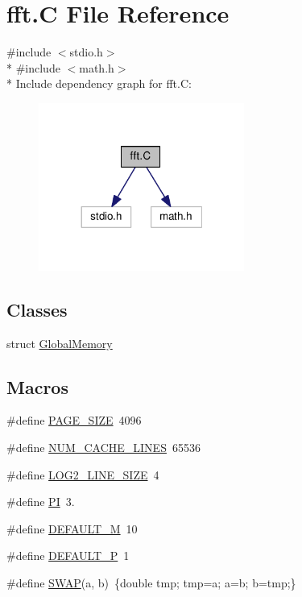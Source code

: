 \hypertarget{fft_8C}{}\section{fft.\+C File Reference}
\label{fft_8C}
{\ttfamily \#include $<$stdio.\+h$>$}\\*
{\ttfamily \#include $<$math.\+h$>$}\\*
Include dependency graph for fft.\+C\+:
\nopagebreak
\begin{figure}[H]
\begin{center}
\leavevmode
\includegraphics[width=191pt]{fft_8C__incl}
\end{center}
\end{figure}
\subsection*{Classes}
\begin{DoxyCompactItemize}
\item 
struct \hyperlink{structGlobalMemory}{Global\+Memory}
\end{DoxyCompactItemize}
\subsection*{Macros}
\begin{DoxyCompactItemize}
\item 
\#define \hyperlink{fft_8C_a7d467c1d283fdfa1f2081ba1e0d01b6e}{P\+A\+G\+E\+\_\+\+S\+I\+Z\+E}~4096
\item 
\#define \hyperlink{fft_8C_a1cf55e02cd2f0edd18a270fa33314670}{N\+U\+M\+\_\+\+C\+A\+C\+H\+E\+\_\+\+L\+I\+N\+E\+S}~65536
\item 
\#define \hyperlink{fft_8C_a05cb055f4f0f37b23d5697a5af1daa72}{L\+O\+G2\+\_\+\+L\+I\+N\+E\+\_\+\+S\+I\+Z\+E}~4
\item 
\#define \hyperlink{fft_8C_a598a3330b3c21701223ee0ca14316eca}{P\+I}~3.
\item 
\#define \hyperlink{fft_8C_a383f5d92772af0967bbc18d6cac778a2}{D\+E\+F\+A\+U\+L\+T\+\_\+\+M}~10
\item 
\#define \hyperlink{fft_8C_a5ef8f72e91130f2eaa3a1308437323c3}{D\+E\+F\+A\+U\+L\+T\+\_\+\+P}~1
\item 
\#define \hyperlink{fft_8C_aac9153aee4bdb92701df902e06a74eb3}{S\+W\+A\+P}(a,  b)~\{double tmp; tmp=a; a=b; b=tmp;\}
\end{DoxyCompactItemize}
